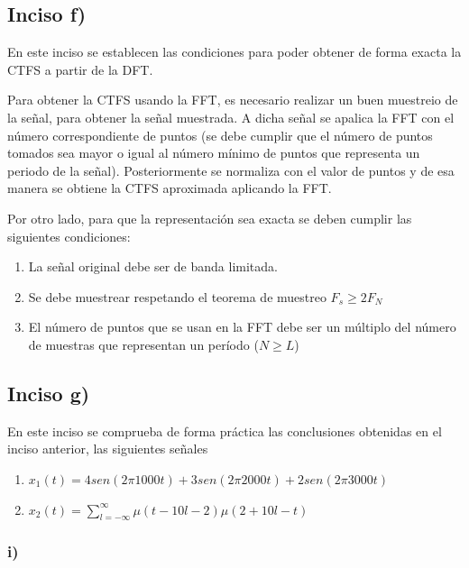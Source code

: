 \documentclass{article}
\begin{document}
    \subsection*{Inciso f)}

    En este inciso se establecen las condiciones para poder obtener de forma exacta la 
    CTFS a partir de la DFT.

    Para obtener la CTFS usando la FFT, es necesario realizar un buen muestreio de la señal, 
    para obtener la señal muestrada. A dicha señal se apalica la FFT con el número correspondiente
    de puntos (se debe cumplir que el número de puntos tomados sea mayor o igual al número mínimo de puntos que representa un periodo de la señal). 
    Posteriormente se normaliza con el valor de puntos 
    y de esa manera se obtiene la CTFS aproximada aplicando la FFT.

    Por otro lado, para que la representación sea exacta se deben cumplir las siguientes condiciones:
    \begin{enumerate}
        \item La señal original debe ser de banda limitada.
        \item Se debe muestrear respetando el teorema de muestreo $F_s\geq 2F_N$
        \item El número de puntos que se usan en la FFT debe ser un múltiplo del número de muestras que representan un período ($N\geq L$)
    \end{enumerate}

    \subsection*{Inciso g)}

    En este inciso se comprueba de forma práctica las conclusiones obtenidas en 
    el inciso anterior, las siguientes señales 
    
    \begin{enumerate}
        \item $x_1(t)= 4 sen( 2\pi 1000 t ) + 3sen( 2\pi 2000 t ) + 2sen( 2\pi 3000 t )$
        \item $ x_2(t)= \sum_{l=-\infty}^{\infty} \mu( t - 10l - 2  )\mu( 2 + 10l - t )$
    \end{enumerate}

    \subsubsection*{i)}
\end{document}
